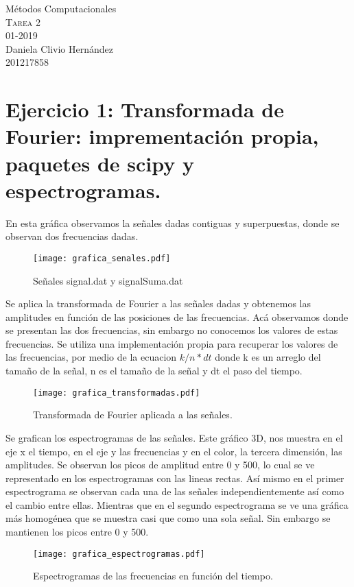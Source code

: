 \documentclass[11pt,letterpaper]{exam}
\begin{document}
\begin{center}
{\Large Métodos Computacionales} \\
\textsc{Tarea 2}\\
01-2019\\
Daniela Clivio Hernández\\
201217858\\
\end{center}

\noindent
\section{Ejercicio 1: Transformada de Fourier: imprementación propia, paquetes de scipy y espectrogramas.}
En esta gráfica observamos la señales dadas contiguas y superpuestas, donde se observan dos frecuencias dadas.\
\begin{figure}[H]
\centering
\texttt{[image: grafica\_senales.pdf]}
\caption{Señales signal.dat y signalSuma.dat}
\label{fig1}
\end{figure}

Se aplica la transformada de Fourier a las señales dadas y obtenemos las amplitudes en función de las posiciones de las frecuencias. Acá observamos donde se presentan las dos frecuencias, sin embargo no conocemos los valores de estas frecuencias. Se utiliza una implementación propia para recuperar los valores de las frecuencias, por medio de la ecuacion $k/n*dt$ donde k es un arreglo del tamaño de la señal, n es el tamaño de la señal y dt el paso del tiempo.\\
\begin{figure}[H]
\centering
\texttt{[image: grafica\_transformadas.pdf]}
\caption{Transformada de Fourier aplicada a las señales.}
\label{fig2}
\end{figure}

Se grafican los espectrogramas de las señales. Este gráfico 3D, nos muestra en el eje x el tiempo, en el eje y las frecuencias y en el color, la tercera dimensión, las amplitudes. Se observan los picos de amplitud entre 0 y 500, lo cual se ve representado en los espectrogramas con las lineas rectas. Así mismo en el primer espectrograma se observan cada una de las señales independientemente así como el cambio entre ellas. Mientras que en el segundo espectrograma se ve una gráfica más homogénea que se muestra casi que como una sola señal. Sin embargo se mantienen los picos entre 0 y 500. \\
\begin{figure}[H]
\centering
\texttt{[image: grafica\_espectrogramas.pdf]}
\caption{Espectrogramas de las frecuencias en función del tiempo.}
\label{fig3}
\end{figure}
\end{document}
